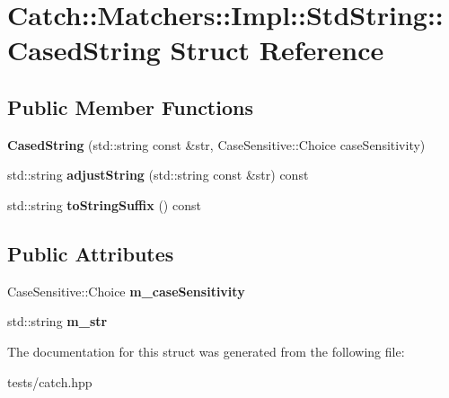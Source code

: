 \hypertarget{struct_catch_1_1_matchers_1_1_impl_1_1_std_string_1_1_cased_string}{}\section{Catch\+:\+:Matchers\+:\+:Impl\+:\+:Std\+String\+:\+:Cased\+String Struct Reference}
\label{struct_catch_1_1_matchers_1_1_impl_1_1_std_string_1_1_cased_string}
\subsection*{Public Member Functions}
\begin{DoxyCompactItemize}
\item 
\mbox{\label{struct_catch_1_1_matchers_1_1_impl_1_1_std_string_1_1_cased_string_aebd017c88423d8a11c62cff85754a22d}} 
{\bfseries Cased\+String} (std\+::string const \&str, Case\+Sensitive\+::\+Choice case\+Sensitivity)
\item 
\mbox{\label{struct_catch_1_1_matchers_1_1_impl_1_1_std_string_1_1_cased_string_a8117fdcee8fd8a8e5001b38e0bd19848}} 
std\+::string {\bfseries adjust\+String} (std\+::string const \&str) const
\item 
\mbox{\label{struct_catch_1_1_matchers_1_1_impl_1_1_std_string_1_1_cased_string_ac12f719f5d1aeb28a2bc2f6cc8b95b37}} 
std\+::string {\bfseries to\+String\+Suffix} () const
\end{DoxyCompactItemize}
\subsection*{Public Attributes}
\begin{DoxyCompactItemize}
\item 
\mbox{\label{struct_catch_1_1_matchers_1_1_impl_1_1_std_string_1_1_cased_string_af399ed93051d8981e298206dee6898b3}} 
Case\+Sensitive\+::\+Choice {\bfseries m\+\_\+case\+Sensitivity}
\item 
\mbox{\label{struct_catch_1_1_matchers_1_1_impl_1_1_std_string_1_1_cased_string_a9f8ce063a934330ac59bf8638f047e99}} 
std\+::string {\bfseries m\+\_\+str}
\end{DoxyCompactItemize}


The documentation for this struct was generated from the following file\+:\begin{DoxyCompactItemize}
\item 
tests/catch.\+hpp\end{DoxyCompactItemize}
